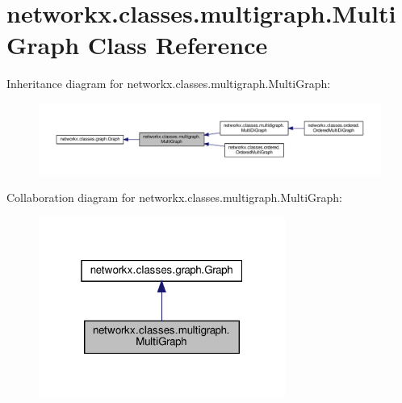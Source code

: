 \hypertarget{classnetworkx_1_1classes_1_1multigraph_1_1MultiGraph}{}\section{networkx.\+classes.\+multigraph.\+Multi\+Graph Class Reference}
\label{classnetworkx_1_1classes_1_1multigraph_1_1MultiGraph}


Inheritance diagram for networkx.\+classes.\+multigraph.\+Multi\+Graph\+:
\nopagebreak
\begin{figure}[H]
\begin{center}
\leavevmode
\includegraphics[width=350pt]{classnetworkx_1_1classes_1_1multigraph_1_1MultiGraph__inherit__graph}
\end{center}
\end{figure}


Collaboration diagram for networkx.\+classes.\+multigraph.\+Multi\+Graph\+:
\nopagebreak
\begin{figure}[H]
\begin{center}
\leavevmode
\includegraphics[width=229pt]{classnetworkx_1_1classes_1_1multigraph_1_1MultiGraph__coll__graph}
\end{center}
\end{figure}

